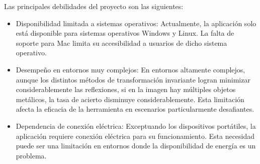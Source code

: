 Las principales debilidades del proyecto son las siguientes:

\begin{itemize}
    \item Disponibilidad limitada a sistemas operativos: Actualmente, la aplicación solo está disponible para sistemas operativos Windows y Linux. La falta de soporte para Mac limita su accesibilidad a usuarios de dicho sistema operativo.
    \item Desempeño en entornos muy complejos: En entornos altamente complejos, aunque los distintos métodos de transformación invariante logran minimizar considerablemente las reflexiones, si en la imagen hay múltiples objetos metálicos, la tasa de acierto disminuye considerablemente. Esta limitación afecta la eficacia de la herramienta en escenarios particularmente desafiantes.
    \item Dependencia de conexión eléctrica: Exceptuando los dispositivos portátiles, la aplicación requiere conexión eléctrica para su funcionamiento. Esta necesidad puede ser una limitación en entornos donde la disponibilidad de energía es un problema.
\end{itemize}
